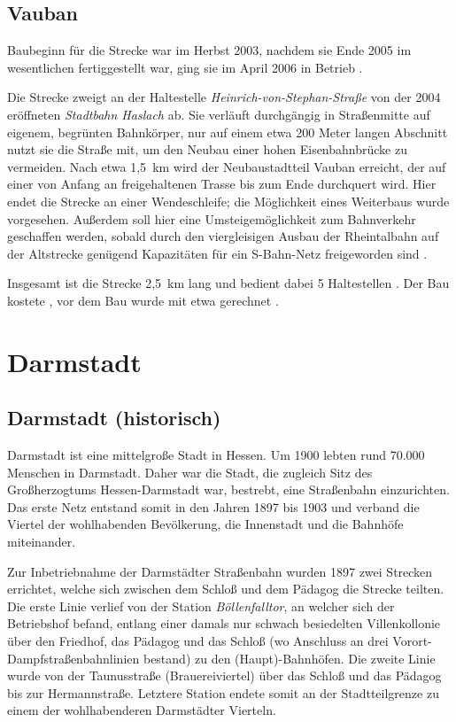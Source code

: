 \subsection*{Vauban}

Baubeginn für die Strecke war im Herbst 2003, nachdem sie Ende 2005 im wesentlichen fertiggestellt war, ging sie im April 2006 in Betrieb \cite{FRabv}.

Die Strecke zweigt an der Haltestelle \textit{Heinrich-von-Stephan-Straße} von der 2004 eröffneten \textit{Stadtbahn Haslach} ab.
Sie verläuft durchgängig in Straßenmitte auf eigenem, begrünten Bahnkörper, nur auf einem etwa 200 Meter langen Abschnitt nutzt sie die Straße mit, um den Neubau einer hohen Eisenbahnbrücke zu vermeiden.
Nach etwa 1,5{\ }km wird der Neubaustadtteil Vauban erreicht, der auf einer von Anfang an freigehaltenen Trasse bis zum Ende durchquert wird.
Hier endet die Strecke an einer Wendeschleife; die Möglichkeit eines Weiterbaus wurde vorgesehen.
Außerdem soll hier eine Umsteigemöglichkeit zum Bahnverkehr geschaffen werden, sobald durch den viergleisigen Ausbau der Rheintalbahn auf der Altstrecke genügend Kapazitäten für ein S-Bahn-Netz freigeworden sind \cite{FRabv} \cite{beob}.

Insgesamt ist die Strecke 2,5{\ }km lang und bedient dabei 5 Haltestellen \cite{FRabv}.
Der Bau kostete  \cite{FRabv2}, vor dem Bau wurde mit etwa  gerechnet \cite{FRbku}.


\section{Darmstadt}

\subsection*{Darmstadt (historisch)}

Darmstadt ist eine mittelgroße Stadt in Hessen. Um 1900 lebten rund 70.000
Menschen in Darmstadt. Daher war die Stadt, die zugleich Sitz des Großherzogtums
Hessen-Darmstadt war, bestrebt, eine Straßenbahn einzurichten. Das erste Netz
entstand somit in den Jahren 1897 bis 1903 und verband die Viertel der
wohlhabenden Bevölkerung, die Innenstadt und die Bahnhöfe miteinander. \cite{buernheim1997bahnen}

Zur Inbetriebnahme der Darmstädter Straßenbahn wurden 1897 zwei Strecken
errichtet, welche sich zwischen dem Schloß und dem Pädagog die Strecke
teilten. Die erste Linie verlief von der Station \emph{Böllenfalltor}, an
welcher sich der Betriebshof befand, entlang einer damals nur schwach
besiedelten Villenkollonie über den Friedhof, das Pädagog und das Schloß (wo
Anschluss an drei Vorort-Dampfstraßenbahnlinien bestand) zu den
(Haupt)-Bahnhöfen. Die zweite Linie wurde von der Taunusstraße (Brauereiviertel)
über das Schloß und das Pädagog bis zur Hermannstraße. Letztere Station endete
somit an der Stadtteilgrenze zu einem der wohlhabenderen Darmstädter Vierteln. \cite{hoeltge1992hessen}

